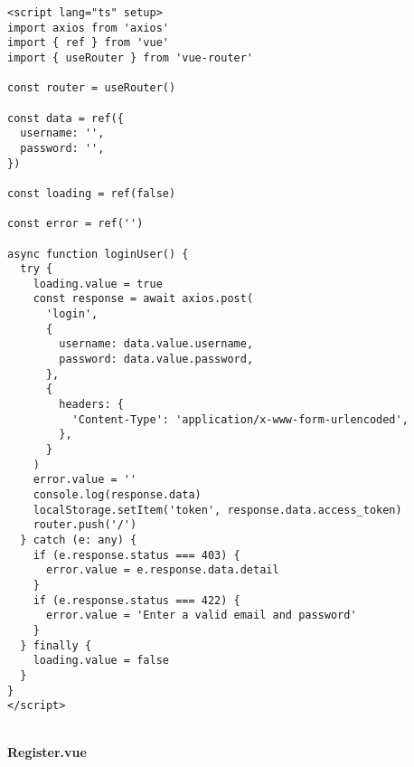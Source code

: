 \begin{Verbatim}[breaklines=true, breakanywhere=true]
<script lang="ts" setup>
import axios from 'axios'
import { ref } from 'vue'
import { useRouter } from 'vue-router'

const router = useRouter()

const data = ref({
  username: '',
  password: '',
})

const loading = ref(false)

const error = ref('')

async function loginUser() {
  try {
    loading.value = true
    const response = await axios.post(
      'login',
      {
        username: data.value.username,
        password: data.value.password,
      },
      {
        headers: {
          'Content-Type': 'application/x-www-form-urlencoded',
        },
      }
    )
    error.value = ''
    console.log(response.data)
    localStorage.setItem('token', response.data.access_token)
    router.push('/')
  } catch (e: any) {
    if (e.response.status === 403) {
      error.value = e.response.data.detail
    }
    if (e.response.status === 422) {
      error.value = 'Enter a valid email and password'
    }
  } finally {
    loading.value = false
  }
}
</script>

\end{Verbatim}
\
\\
\textbf{Register.vue}

